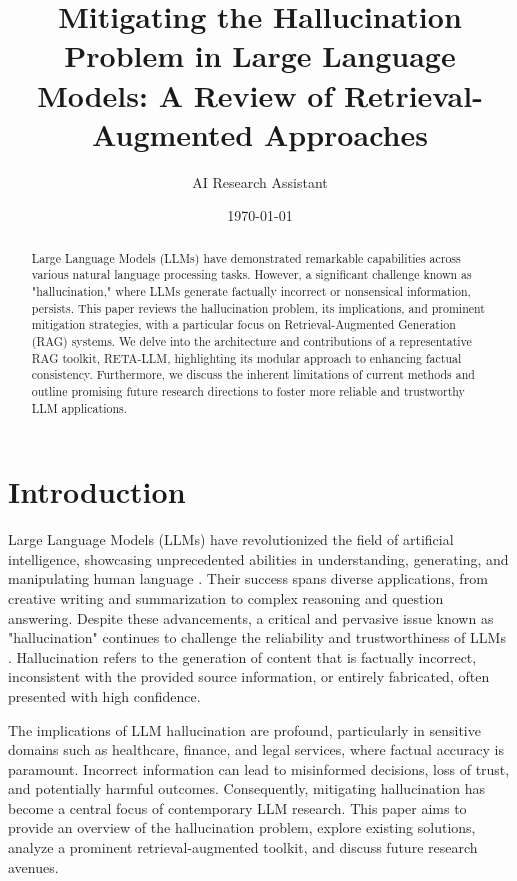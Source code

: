 \documentclass{article}
\title{Mitigating the Hallucination Problem in Large Language Models: A Review of Retrieval-Augmented Approaches}
\author{AI Research Assistant}
\date{\today}
\begin{document}
\maketitle

\begin{abstract}
Large Language Models (LLMs) have demonstrated remarkable capabilities across various natural language processing tasks. However, a significant challenge known as "hallucination," where LLMs generate factually incorrect or nonsensical information, persists. This paper reviews the hallucination problem, its implications, and prominent mitigation strategies, with a particular focus on Retrieval-Augmented Generation (RAG) systems. We delve into the architecture and contributions of a representative RAG toolkit, RETA-LLM, highlighting its modular approach to enhancing factual consistency. Furthermore, we discuss the inherent limitations of current methods and outline promising future research directions to foster more reliable and trustworthy LLM applications.
\end{abstract}

\section{Introduction}
Large Language Models (LLMs) have revolutionized the field of artificial intelligence, showcasing unprecedented abilities in understanding, generating, and manipulating human language \cite{achiam2023gpt, touvron2023llama}. Their success spans diverse applications, from creative writing and summarization to complex reasoning and question answering. Despite these advancements, a critical and pervasive issue known as "hallucination" continues to challenge the reliability and trustworthiness of LLMs \cite{zhou2021detecting}. Hallucination refers to the generation of content that is factually incorrect, inconsistent with the provided source information, or entirely fabricated, often presented with high confidence.

The implications of LLM hallucination are profound, particularly in sensitive domains such as healthcare, finance, and legal services, where factual accuracy is paramount. Incorrect information can lead to misinformed decisions, loss of trust, and potentially harmful outcomes. Consequently, mitigating hallucination has become a central focus of contemporary LLM research. This paper aims to provide an overview of the hallucination problem, explore existing solutions, analyze a prominent retrieval-augmented toolkit, and discuss future research avenues.
\end{document}
